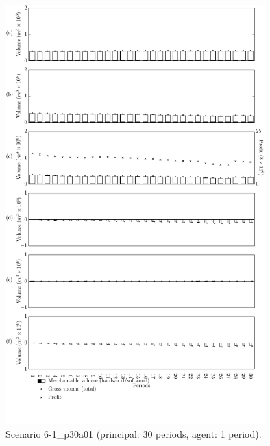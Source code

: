 \begin{figure}[h]
  \centering
  \includegraphics[width=10cm]{images/appendix/s6-1_p30a01}
  \caption{Scenario 6-1\_p30a01 (principal: 30 periods, agent: 1 period).}
  \label{fig:s6-1_p30a01}
\end{figure}


